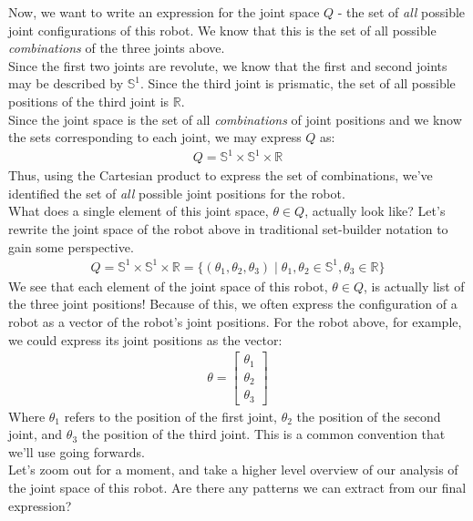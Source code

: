 \documentclass[oneside]{book}
\begin{document}
Now, we want to write an expression for the joint space $Q$ - the set of \textit{all} possible joint configurations of this robot. We know that this is the set of all possible \textit{combinations} of the three joints above.\\
Since the first two joints are revolute, we know that the first and second joints may be described by $\mathbb{S}^1$. Since the third joint is prismatic, the set of all possible positions of the third joint is $\mathbb{R}$.\\
Since the joint space is the set of all \textit{combinations} of joint positions and we know the sets corresponding to each joint, we may express $Q$ as:
\begin{align}
    Q = \mathbb{S}^1\times \mathbb{S}^1 \times \mathbb{R}
\end{align}
Thus, using the Cartesian product to express the set of combinations, we've identified the set of \textit{all} possible joint positions for the robot.\\
What does a single element of this joint space, $\theta \in Q$, actually look like? Let's rewrite the joint space of the robot above in traditional set-builder notation to gain some perspective.
\begin{align}
    Q = \mathbb{S}^1\times \mathbb{S}^1 \times \mathbb{R}
    = \{(\theta_1, \theta_2, \theta_3) \; | \; \theta_1, \theta_2 \in \mathbb{S}^1, \theta_3 \in \mathbb{R} \}
\end{align}
We see that each element of the joint space of this robot, $\theta \in Q$, is actually list of the three joint positions! Because of this, we often express the configuration of a robot as a vector of the robot's joint positions. For the robot above, for example, we could express its joint positions as the vector:
\begin{align}
    \theta = \begin{bmatrix}
    \theta_1\\
    \theta_2\\
    \theta_3
    \end{bmatrix}
\end{align}
Where $\theta_1$ refers to the position of the first joint, $\theta_2$ the position of the second joint, and $\theta_3$ the position of the third joint. This is a common convention that we'll use going forwards.\\
Let's zoom out for a moment, and take a higher level overview of our analysis of the joint space of this robot. Are there any patterns we can extract from our final expression? \\
\end{document}
